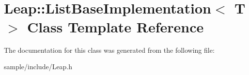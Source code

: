 \hypertarget{class_leap_1_1_list_base_implementation}{}\section{Leap\+:\+:List\+Base\+Implementation$<$ T $>$ Class Template Reference}
\label{class_leap_1_1_list_base_implementation}


The documentation for this class was generated from the following file\+:\begin{DoxyCompactItemize}
\item 
sample/include/Leap.\+h\end{DoxyCompactItemize}

